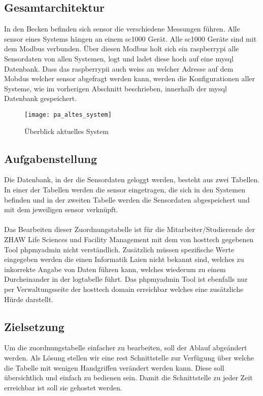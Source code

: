 \documentclass[../main.tex]{subfiles}
\begin{document}
	\subsection{Gesamtarchitektur}
	In den Becken befinden sich \gls{sensor} die verschiedene Messungen führen. Alle \gls{sensor} eines Systems hängen an einem \gls{sc1000} Gerät. Alle \gls{sc1000} Geräte sind mit dem Modbus verbunden. Über diesen Modbus holt sich ein \gls{raspberrypi} alle Sensordaten von allen Systemen, logt und ladet diese hoch auf eine \gls{mysql} Datenbank. Dass das \gls{raspberrypi}i auch weiss an welcher Adresse auf dem Mobdus welcher \gls{sensor} abgefragt werden kann, werden die Konfigurationen aller Systeme, wie im vorherigen Abschnitt beschrieben, innerhalb der \gls{mysql} Datenbank gespeichert.
	\begin{figure}[H]
		\centering
		\texttt{[image: pa\_altes\_system]}
		\caption{Überblick aktuelles System}
		\label{fig:pa_altes_system}
	\end{figure}
	
	\subsection{Aufgabenstellung}
	Die Datenbank, in der die Sensordaten geloggt werden, besteht aus zwei Tabellen. In einer der Tabellen werden die \gls{sensor} eingetragen, die sich in den Systemen befinden und in der zweiten Tabelle werden die Sensordaten abgespeichert und mit dem jeweiligen \gls{sensor} verknüpft. \\
	\\	
	Das Bearbeiten dieser Zuordnungstabelle ist für die Mitarbeiter/Studierende der ZHAW Life Sciences und Facility Management mit dem von \gls{hosttech} gegebenen Tool \gls{phpmyadmin} nicht verständlich. Zusätzlich müssen spezifische Werte eingegeben werden die einen Informatik Laien nicht bekannt sind, welches zu inkorrekte Angabe von Daten führen kann, welches wiederum zu einem Durcheinander in der \gls{logtabelle} führt. 
	Das \gls{phpmyadmin} Tool ist ebenfalls nur per Verwaltungsseite der \gls{hosttech} \gls{domain} erreichbar welches eine zusätzliche Hürde darstellt.
	
	\subsection{Zielsetzung}
	Um die \gls{zuordnungstabelle} einfacher zu bearbeiten, soll der Ablauf abgeändert werden. Als Lösung stellen wir eine \gls{rest} Schnittstelle zur Verfügung über welche die Tabelle mit wenigen Handgriffen verändert werden kann. 
	Diese soll übersichtlich und einfach zu bedienen sein. Damit die Schnittstelle zu jeder Zeit erreichbar ist soll sie gehostet werden.
\end{document}
